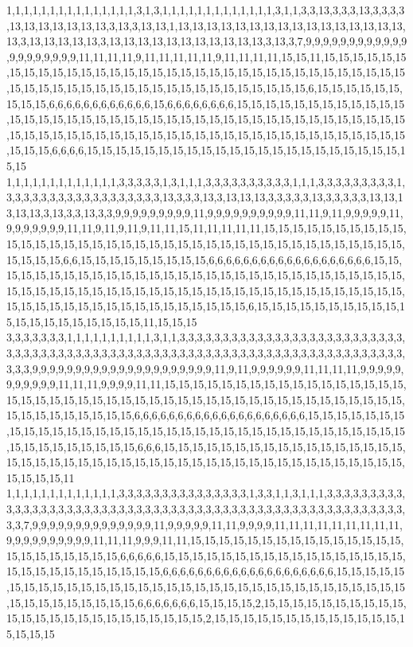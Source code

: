 1,1,1,1,1,1,1,1,1,1,1,1,1,1,1,3,1,3,1,1,1,1,1,1,1,1,1,1,1,1,1,3,1,1,3,3,13,3,3,3,13,3,3,3,3,13,13,13,13,13,13,13,3,13,3,13,13,1,13,13,13,13,13,13,13,13,13,13,13,13,13,13,13,13,13,3,13,13,13,13,13,3,13,13,13,13,13,13,13,13,13,13,13,3,13,3,7,9,9,9,9,9,9,9,9,9,9,9,9,9,9,9,9,9,9,9,9,11,11,11,11,9,11,11,11,11,11,9,11,11,11,11,15,15,11,15,15,15,15,15,15,15,15,15,15,15,15,15,15,15,15,15,15,15,15,15,15,15,15,15,15,15,15,15,15,15,15,15,15,15,15,15,15,15,15,15,15,15,15,15,15,15,15,15,15,15,15,15,15,15,6,15,15,15,15,15,15,15,15,15,6,6,6,6,6,6,6,6,6,6,6,6,15,6,6,6,6,6,6,6,6,15,15,15,15,15,15,15,15,15,15,15,15,15,15,15,15,15,15,15,15,15,15,15,15,15,15,15,15,15,15,15,15,15,15,15,15,15,15,15,15,15,15,15,15,15,15,15,15,15,15,15,15,15,15,15,15,15,15,15,15,15,15,15,15,15,15,15,15,15,15,15,6,6,6,6,15,15,15,15,15,15,15,15,15,15,15,15,15,15,15,15,15,15,15,15,15,15,15,15
1,1,1,1,1,1,1,1,1,1,1,1,1,3,3,3,3,3,1,3,1,1,1,3,3,3,3,3,3,3,3,3,3,1,1,1,3,3,3,3,3,3,3,3,3,1,3,3,3,3,3,3,3,3,3,3,3,3,3,3,3,3,3,3,13,3,3,3,13,3,13,13,13,3,3,3,3,3,13,3,3,3,3,3,13,13,13,13,13,3,13,3,3,13,3,3,9,9,9,9,9,9,9,9,9,11,9,9,9,9,9,9,9,9,9,9,11,11,9,11,9,9,9,9,9,11,9,9,9,9,9,9,9,11,11,9,11,9,11,9,11,11,15,11,11,11,11,11,15,15,15,15,15,15,15,15,15,15,15,15,15,15,15,15,15,15,15,15,15,15,15,15,15,15,15,15,15,15,15,15,15,15,15,15,15,15,15,15,15,15,6,6,15,15,15,15,15,15,15,15,15,6,6,6,6,6,6,6,6,6,6,6,6,6,6,6,6,6,6,6,15,15,15,15,15,15,15,15,15,15,15,15,15,15,15,15,15,15,15,15,15,15,15,15,15,15,15,15,15,15,15,15,15,15,15,15,15,15,15,15,15,15,15,15,15,15,15,15,15,15,15,15,15,15,15,15,15,15,15,15,15,15,15,15,15,15,15,15,15,15,15,15,15,15,15,6,15,15,15,15,15,15,15,15,15,15,15,15,15,15,15,15,15,15,15,15,11,15,15,15
3,3,3,3,3,3,3,1,1,1,1,1,1,1,1,1,1,3,1,1,3,3,3,3,3,3,3,3,3,3,3,3,3,3,3,3,3,3,3,3,3,3,3,3,3,3,3,3,3,3,3,3,3,3,3,3,3,3,3,3,3,3,3,3,3,3,3,3,3,3,3,3,3,3,3,3,3,3,3,3,3,3,3,3,3,3,3,3,3,3,3,3,3,3,3,9,9,9,9,9,9,9,9,9,9,9,9,9,9,9,9,9,9,9,9,9,11,9,11,9,9,9,9,9,9,11,11,11,11,9,9,9,9,9,9,9,9,9,9,9,11,11,11,9,9,9,9,11,11,15,15,15,15,15,15,15,15,15,15,15,15,15,15,15,15,15,15,15,15,15,15,15,15,15,15,15,15,15,15,15,15,15,15,15,15,15,15,15,15,15,15,15,15,15,15,15,15,15,15,15,15,15,15,6,6,6,6,6,6,6,6,6,6,6,6,6,6,6,6,6,6,6,6,15,15,15,15,15,15,15,15,15,15,15,15,15,15,15,15,15,15,15,15,15,15,15,15,15,15,15,15,15,15,15,15,15,15,15,15,15,15,15,15,15,15,15,15,6,6,6,15,15,15,15,15,15,15,15,15,15,15,15,15,15,15,15,15,15,15,15,15,15,15,15,15,15,15,15,15,15,15,15,15,15,15,15,15,15,15,15,15,15,15,15,15,15,15,15,15,11
1,1,1,1,1,1,1,1,1,1,1,1,1,3,3,3,3,3,3,3,3,3,3,3,3,3,3,3,1,3,3,1,1,3,1,1,1,3,3,3,3,3,3,3,3,3,3,3,3,3,3,3,3,3,3,3,3,3,3,3,3,3,3,3,3,3,3,3,3,3,3,3,3,3,3,3,3,3,3,3,3,3,3,3,3,3,3,3,3,3,3,3,3,3,7,9,9,9,9,9,9,9,9,9,9,9,9,9,9,11,9,9,9,9,9,11,11,9,9,9,9,11,11,11,11,11,11,11,11,11,9,9,9,9,9,9,9,9,9,9,11,11,11,9,9,9,11,11,15,15,15,15,15,15,15,15,15,15,15,15,15,15,15,15,15,15,15,15,15,15,15,6,6,6,6,6,15,15,15,15,15,15,15,15,15,15,15,15,15,15,15,15,15,15,15,15,15,15,15,15,15,15,15,15,6,6,6,6,6,6,6,6,6,6,6,6,6,6,6,6,6,6,6,6,15,15,15,15,15,15,15,15,15,15,15,15,15,15,15,15,15,15,15,15,15,15,15,15,15,15,15,15,15,15,15,15,15,15,15,15,15,15,15,15,15,15,6,6,6,6,6,6,6,15,15,15,15,2,15,15,15,15,15,15,15,15,15,15,15,15,15,15,15,15,15,15,15,15,15,15,15,15,2,15,15,15,15,15,15,15,15,15,15,15,15,15,15,15,15,15

